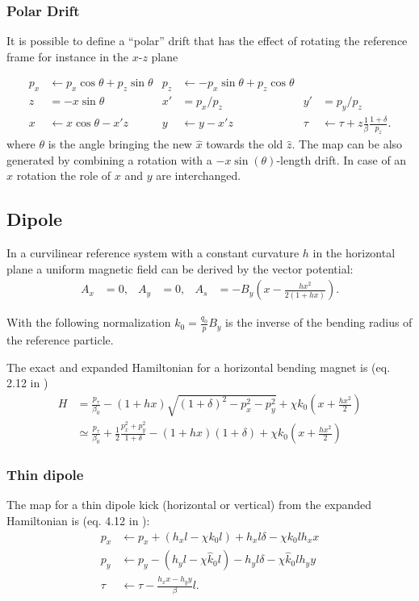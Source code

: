 \subsubsection{Polar Drift}
It is possible to define a ``polar'' drift that has the effect of rotating the reference frame
\cite{forest99} for instance in the $x$-$z$ plane

\begin{align}
p_x & \leftarrow   p_x \cos \theta + p_z \sin\theta &
p_z & \leftarrow - p_x \sin \theta + p_z \cos\theta \\
z   &= -x \sin \theta & x' &= p_x/p_z &  y' &= p_y/p_z \\
x   & \leftarrow x \cos\theta - x' z  &
y   & \leftarrow y - x' z  & \tau & \leftarrow \tau + z\frac{1}{\beta}\frac{1+\delta}{p_z} .
\end{align}
where $\theta$ is the angle bringing the new $\hat x$ towards the old $\hat z$.
The map can be also generated by combining a rotation with a $-x
\sin(\theta)$-length drift. In case of an $\hat x$ rotation the role of $x$ and $y$ are interchanged. 


\subsection{Dipole}

In a curvilinear reference system with a constant curvature $h$ in the
horizontal plane a uniform magnetic field can be derived by the vector potential:
\begin{align}
  A_x & = 0, & A_y & = 0, & A_s & = 
  - B_y \left(x-\frac{h x^2}{2 (1+h x)}\right).
\end{align}

With the following normalization $k_0=\frac{q_0}{p} B_y$ is the inverse of the bending 
radius of the reference particle.

The exact and expanded Hamiltonian for a horizontal bending magnet is (eq. 2.12 in
\cite{barber87})
\begin{align}
  H &= \frac{p_\tau}{\beta_0} 
       - (1+h x)\sqrt{(1+\delta)^2 -p_x^2 - p_y^2}
       + \chi k_0 \left( x + \frac{h x^2}{2} \right)  \\
    &\simeq   \frac{p_\tau}{\beta_0}
    + \frac{1}{2}\frac{p_x^2+p_y^2}{1+\delta}
  - (1+h x) (1+\delta) + \chi k_0 \left( x + \frac{h x^2}{2} \right)
\end{align}


\subsubsection{Thin dipole}
The map for a thin dipole kick (horizontal or vertical) from the expanded Hamiltonian is 
(eq. 4.12 in \cite{heinemann95}):
\begin{align}
  p_x &\leftarrow p_x + (h_x l - \chi k_0 l)  + h_x l \delta - \chi k_0 l h_x x \\
  p_y &\leftarrow p_y - (h_y l - \chi \hat k_0 l) - h_y l \delta - \chi \hat k_0 l h_y y\\
  \tau &\leftarrow \tau - \frac{h_xx - h_yy}{\beta}  l.
\end{align}


